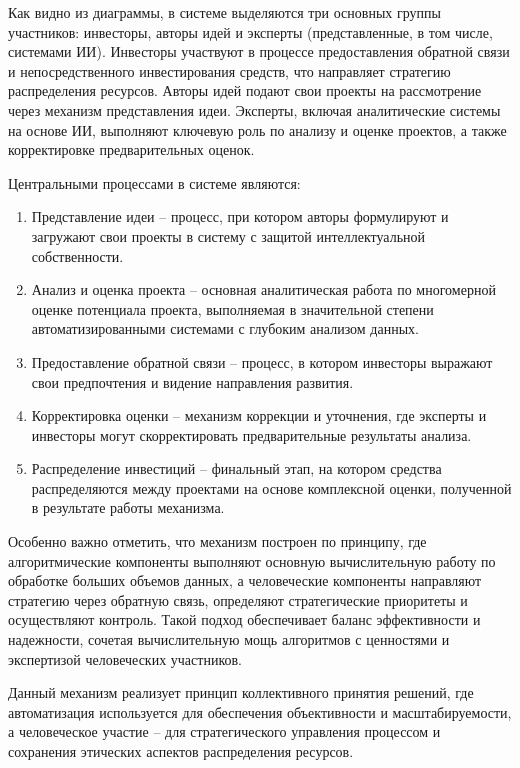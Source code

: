 \documentclass[
    14pt,
    specialist,
    candidate, %
    subf, %
    href,
    dotsinheaders=false
]{disser}
\begin{document}
Как видно из диаграммы, в системе выделяются три основных группы участников: инвесторы, авторы идей и эксперты (представленные, в том числе, системами ИИ). Инвесторы участвуют в процессе предоставления обратной связи и непосредственного инвестирования средств, что направляет стратегию распределения ресурсов. Авторы идей подают свои проекты на рассмотрение через механизм представления идеи. Эксперты, включая аналитические системы на основе ИИ, выполняют ключевую роль по анализу и оценке проектов, а также корректировке предварительных оценок.

Центральными процессами в системе являются:

\begin{enumerate}
  \item Представление идеи -- процесс, при котором авторы формулируют и загружают свои проекты в систему с защитой интеллектуальной собственности.

  \item Анализ и оценка проекта -- основная аналитическая работа по многомерной оценке потенциала проекта, выполняемая в значительной степени автоматизированными системами с глубоким анализом данных.

  \item Предоставление обратной связи -- процесс, в котором инвесторы выражают свои предпочтения и видение направления развития.

  \item Корректировка оценки -- механизм коррекции и уточнения, где эксперты и инвесторы могут скорректировать предварительные результаты анализа.

  \item Распределение инвестиций -- финальный этап, на котором средства распределяются между проектами на основе комплексной оценки, полученной в результате работы механизма.
\end{enumerate}

Особенно важно отметить, что механизм построен по принципу, где алгоритмические компоненты выполняют основную вычислительную работу по обработке больших объемов данных, а человеческие компоненты направляют стратегию через обратную связь, определяют стратегические приоритеты и осуществляют контроль. Такой подход обеспечивает баланс эффективности и надежности, сочетая вычислительную мощь алгоритмов с ценностями и экспертизой человеческих участников.

Данный механизм реализует принцип коллективного принятия решений, где автоматизация используется для обеспечения объективности и масштабируемости, а человеческое участие – для стратегического управления процессом и сохранения этических аспектов распределения ресурсов.
\end{document}

